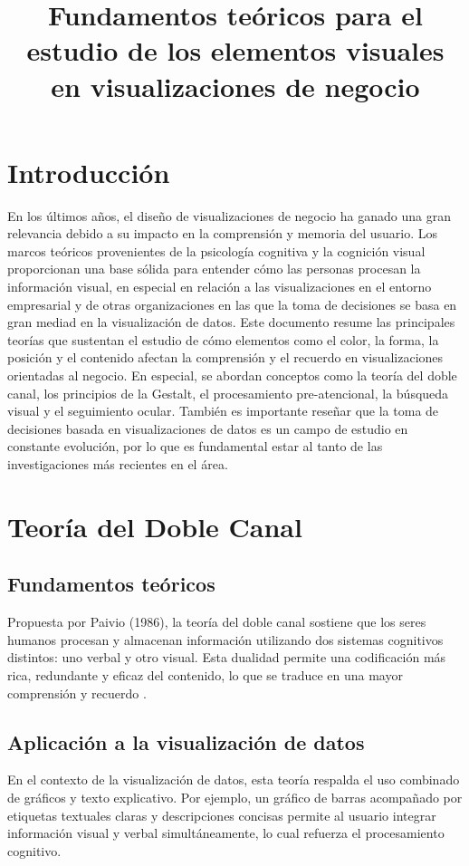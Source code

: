 \documentclass[12pt]{article}
\title{Fundamentos teóricos para el estudio de los elementos visuales en visualizaciones de negocio}
\begin{document}
\maketitle
\onehalfspacing

\section{Introducción}
En los últimos años, el diseño de visualizaciones de negocio ha ganado una gran relevancia debido a su impacto en la comprensión y memoria del usuario. Los marcos teóricos provenientes de la psicología cognitiva y la cognición visual proporcionan una base sólida para entender cómo las personas procesan la información visual, en especial en relación a las visualizaciones en el entorno empresarial y de otras organizaciones en las que la toma de decisiones se basa en gran mediad en la visualización de datos. Este documento resume las principales teorías que sustentan el estudio de cómo elementos como el color, la forma, la posición y el contenido afectan la comprensión y el recuerdo en visualizaciones orientadas al negocio. En especial, se abordan conceptos como la teoría del doble canal, los principios de la Gestalt, el procesamiento pre-atencional, la búsqueda visual y el seguimiento ocular. También es importante reseñar que la toma de decisiones basada en visualizaciones de datos es un campo de estudio en constante evolución, por lo que es fundamental estar al tanto de las investigaciones más recientes en el área.

\section{Teoría del Doble Canal}

\subsection{Fundamentos teóricos}
Propuesta por Paivio (1986), la teoría del doble canal sostiene que los seres humanos procesan y almacenan información utilizando dos sistemas cognitivos distintos: uno verbal y otro visual. Esta dualidad permite una codificación más rica, redundante y eficaz del contenido, lo que se traduce en una mayor comprensión y recuerdo \parencite{paivio1986}.

\subsection{Aplicación a la visualización de datos}
En el contexto de la visualización de datos, esta teoría respalda el uso combinado de gráficos y texto explicativo. Por ejemplo, un gráfico de barras acompañado por etiquetas textuales claras y descripciones concisas permite al usuario integrar información visual y verbal simultáneamente, lo cual refuerza el procesamiento cognitivo.
\end{document}
